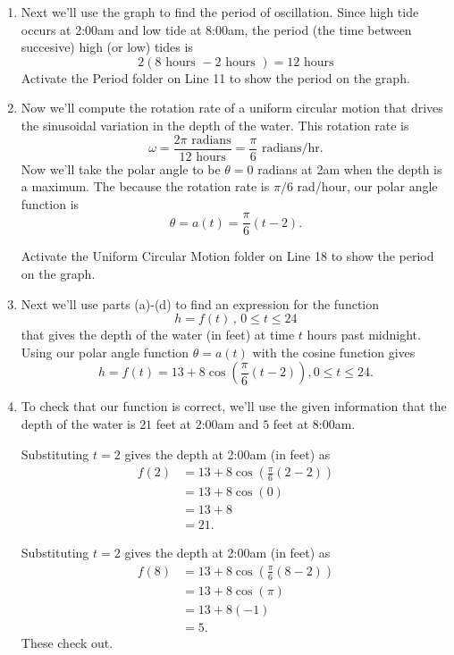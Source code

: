 \documentclass{ximera}
\begin{document}
\begin{example}
\begin{explanation}
\begin{enumerate}
\item Next we'll use the graph to find the period of oscillation. Since high tide occurs at 2:00am and low tide at 8:00am, the period (the time between succesive) high (or low) tides is
\[
    2(8 \text{ hours } - 2 \text{ hours }) = 12 \text{ hours}
\]
Activate the Period folder on Line 11 to show the period on the graph.

\item Now we'll compute the rotation rate of a uniform circular motion that drives the sinusoidal variation in the depth of the water. This rotation rate is
\[
  \omega = \frac{2\pi \text{ radians}}{12 \text{ hours}} = \frac{\pi}{6} \text{ radians/hr} .
\]
Now we'll take the polar angle to be $\theta=0$ radians at 2am when the depth is a maximum. The because the rotation rate is $\pi/6$ rad/hour, our polar angle function is
\[
   \theta = a(t) = \frac{\pi}{6} \left(  t - 2  \right) .
\]

Activate the Uniform Circular Motion folder on Line 18 to show the period on the graph.

\item Next we'll use parts (a)-(d) to find an expression for the function
\[
           h = f(t) \, , \, 0\leq t \leq 24
\]
that gives the depth of the water (in feet) at time $t$ hours past midnight. Using our polar angle function $\theta = a(t)$ with the cosine function gives 
\[
   h  = f(t) = 13 + 8 \cos \left(  \frac{\pi}{6} \left( t - 2 \right) \right),  0\leq t \leq 24.
\]



\item To check that our function is correct, we'll use the given information that the depth of the water is $21$ feet at 2:00am and $5$ feet at 8:00am.

Substituting $t=2$ gives the depth at 2:00am (in feet) as
\begin{align*}
   f(2)   & = 13 + 8 \cos \left(  \frac{\pi}{6} \left( 2 - 2 \right) \right) \\ 
           & = 13 + 8 \cos (0)  \\ 
           & = 13 + 8 \\
           & = 21 .
\end{align*}

Substituting $t=2$ gives the depth at 2:00am (in feet) as
\begin{align*}
   f(8)   & = 13 + 8 \cos \left(  \frac{\pi}{6} \left(8 - 2 \right) \right) \\ 
           & = 13 + 8 \cos (\pi)  \\ 
           & = 13 + 8(-1) \\
           & = 5 .
\end{align*}
These check out.


\end{enumerate}
\end{explanation}
\end{example}
\end{document}
